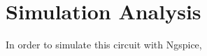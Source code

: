 \section{Simulation Analysis} \label{sec:simulation}

In order to simulate this circuit with Ngspice,
